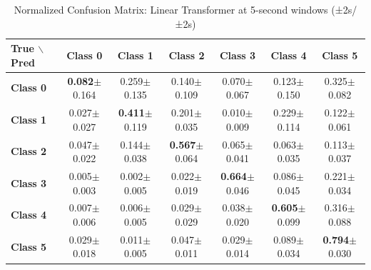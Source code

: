 \begin{table}[htbp]
\centering
\caption{Normalized Confusion Matrix: Linear Transformer at 5-second windows (±2s/±2s)}
\label{tab:app_cm_linear_5s}
\small
\setlength{\tabcolsep}{2pt}
\begin{tabular}{lcccccc}
	\toprule
	\textbf{True $\backslash$ Pred} & \textbf{Class 0} & \textbf{Class 1} & \textbf{Class 2} & \textbf{Class 3} & \textbf{Class 4} & \textbf{Class 5} \\
\midrule
	\textbf{Class 0} & \textbf{0.082}$\pm$0.164 & 0.259$\pm$0.135 & 0.140$\pm$0.109 & 0.070$\pm$0.067 & 0.123$\pm$0.150 & 0.325$\pm$0.082 \\
	\textbf{Class 1} & 0.027$\pm$0.027 & \textbf{0.411}$\pm$0.119 & 0.201$\pm$0.035 & 0.010$\pm$0.009 & 0.229$\pm$0.114 & 0.122$\pm$0.061 \\
	\textbf{Class 2} & 0.047$\pm$0.022 & 0.144$\pm$0.038 & \textbf{0.567}$\pm$0.064 & 0.065$\pm$0.041 & 0.063$\pm$0.035 & 0.113$\pm$0.037 \\
	\textbf{Class 3} & 0.005$\pm$0.003 & 0.002$\pm$0.005 & 0.022$\pm$0.019 & \textbf{0.664}$\pm$0.046 & 0.086$\pm$0.045 & 0.221$\pm$0.034 \\
	\textbf{Class 4} & 0.007$\pm$0.006 & 0.006$\pm$0.005 & 0.029$\pm$0.029 & 0.038$\pm$0.020 & \textbf{0.605}$\pm$0.099 & 0.316$\pm$0.088 \\
	\textbf{Class 5} & 0.029$\pm$0.018 & 0.011$\pm$0.005 & 0.047$\pm$0.011 & 0.029$\pm$0.014 & 0.089$\pm$0.034 & \textbf{0.794}$\pm$0.030 \\
\bottomrule
\end{tabular}
\setlength{\tabcolsep}{6pt}
\end{table}

